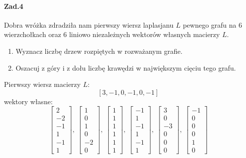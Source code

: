 \paragraph{Zad.4} Dobra wróżka zdradziła nam pierwszy wiersz laplasjanu $L$ pewnego grafu na $6$ wierzchołkach oraz $6$ liniowo niezależnych wektorów własnych macierzy $L$.
\begin{enumerate}[label=\alph*)]
\item Wyznacz liczbę drzew rozpiętych w rozważanym grafie.
\item Oszacuj z góry i z dołu liczbę krawędzi w największym cięciu tego grafu.
\end{enumerate}
Pierwszy wiersz macierzy $L:$
$$[3,-1,0,-1,0,-1]$$
wektory własne:
$$\begin{bmatrix}
2\\-2\\-1\\1\\-1\\1
\end{bmatrix},\ \begin{bmatrix}
1\\0\\1\\0\\-2\\0
\end{bmatrix},\ \begin{bmatrix}
1\\1\\1\\1\\1\\1
\end{bmatrix},\ \begin{bmatrix}
-1\\1\\-1\\1\\-1\\1
\end{bmatrix},\ \begin{bmatrix}
3\\0\\-3\\0\\0\\0
\end{bmatrix},\ \begin{bmatrix}
-1\\0\\0\\0\\1\\0
\end{bmatrix}$$


